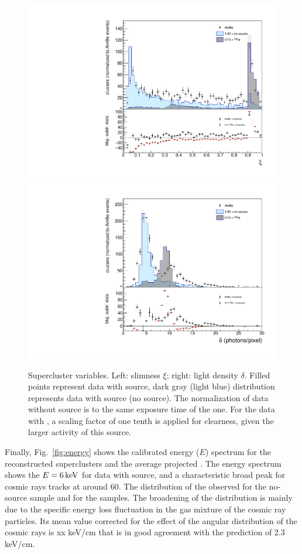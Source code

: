 \begin{figure}[ht]
  \begin{center}
  \includegraphics[width=0.45\linewidth]{figures/slimness}
  \includegraphics[width=0.45\linewidth]{figures/density}

  \caption{Supercluster variables. Left: slimness $\xi$; right: light
    density $\delta$. Filled points represent data with \ambe source,
    dark gray (light blue) distribution represents data with \fe
    source (no source).  The normalization of data without source is
    to the same exposure time of the \ambe one. For the data with \fe,
    a scaling factor of one tenth is applied for clearness, given the
    larger activity of this source. \label{fig:clshape}}

\end{center}
\end{figure}

Finally, Fig.~\ref{fig:energy} shows the calibrated energy ($E$)
spectrum for the reconstructed superclusters and the average projected
\dedl. The energy spectrum shows the $E=6\,\textrm{ke\hspace{-.08em}V}$ for data
with \fe source, and a characteristic broad peak for cosmic rays
tracks at around 60\keV. The distribution of the observed
\dedl for the no-source sample and for the \ambe
samples. The broadening of the distribution is mainly due to the
specific energy loss fluctuation in the gas mixture of the cosmic ray
particles.  Its mean value corrected for the effect of the angular
distribution of the cosmic rays is xx keV/cm that is in good agreement
with the \garfield prediction of 2.3 keV/cm.

